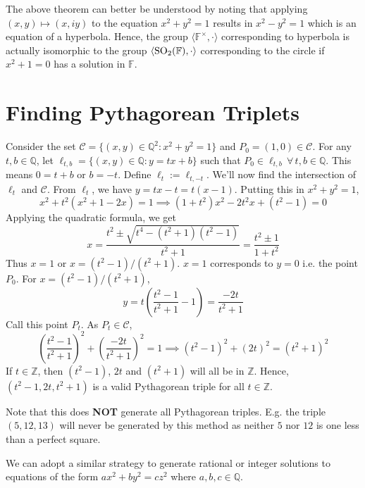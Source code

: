 The above theorem can better be understood by noting that applying
$(x,y)\mapsto(x,iy)$ to the equation $x^2+y^2=1$ results in $x^2-y^2=1$ which is
an equation of a hyperbola. Hence, the group
$\langle\mathbb{F}^\times,\cdot\rangle$ corresponding to hyperbola is actually
isomorphic to the group $\langle\mathrm{SO}_{2}(\mathbb{F}),\cdot\rangle$ corresponding to the circle
if $x^2+1=0$ has a solution in $\mathbb{F}$.

\section{Finding Pythagorean Triplets}

Consider the set $\mathcal{C} = \{(x,y)\in\mathbb{Q}^2: x^2 + y^2 = 1\}$ and
$P_0 = (1,0)\in\mathcal{C}$. For any $t,b\in\mathbb{Q}$, let
$\ell_{t,b}=\{(x,y)\in\mathbb{Q}:y=tx+b\}$ such that
$P_0\in\ell_{t,b}\,\forall\,t,b\in\mathbb{Q}$. This means $0 = t + b$ or $b = -t$.
Define $\ell_t:=\ell_{t,-t}$. We'll now find the intersection of $\ell_t$ and
$\mathcal{C}$. From $\ell_t$, we have $y = tx - t = t(x - 1)$. Putting this in
$x^2 + y^2 = 1$,
\[ x^2 + t^2(x^2 + 1 - 2x) = 1 \implies (1+t^2)x^2 - 2 t^2 x + (t^2 - 1) = 0 \]
Applying the quadratic formula, we get
\[
    x = \frac{t^2 \pm \sqrt{t^4 - (t^2+1)(t^2-1)}}{t^2+1}
    = \frac{t^2 \pm 1}{1 + t^2}
\]
Thus $x = 1$ or $x = (t^2-1)/(t^2+1)$. $x=1$ corresponds to $y=0$ i.e. the point
$P_0$. For $x = (t^2-1)/(t^2+1)$,
\[ y = t\left(\frac{t^2-1}{t^2+1}-1\right) = \frac{-2t}{t^2+1} \]
Call this point $P_t$. As $P_t\in\mathcal{C}$,
\[
    \left(\frac{t^2-1}{t^2+1}\right)^2 + \left(\frac{-2t}{t^2+1}\right)^2 = 1
    \implies (t^2-1)^2 + (2t)^2 = (t^2+1)^2
\]
If $t\in\mathbb{Z}$, then $(t^2-1)$, $2t$ and $(t^2+1)$ will all be in
$\mathbb{Z}$. Hence, $(t^2-1, 2t, t^2+1)$ is a valid Pythagorean triple
for all $t\in\mathbb{Z}$.

Note that this does \textbf{NOT} generate all Pythagorean triples. E.g. the triple
$(5,12,13)$ will never be generated by this method as neither $5$ nor $12$ is one
less than a perfect square.
\vspace{1ex}

We can adopt a similar strategy to generate rational or integer solutions to
equations of the form $ax^2+by^2=cz^2$ where $a,b,c\in\mathbb{Q}$.
